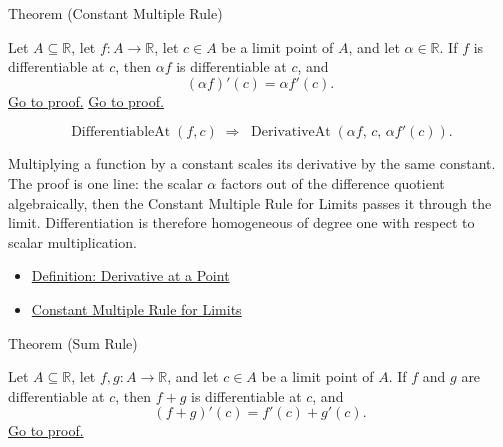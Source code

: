 
\begin{theorembox}{Theorem (Constant Multiple Rule)}
\begin{theorem}
\label{thm:constant-multiple-rule}
Let $A \subseteq \mathbb{R}$, let $f : A \to \mathbb{R}$, let $c \in A$ be a limit point of $A$, and let $\alpha \in \mathbb{R}$. If $f$ is differentiable at $c$, then $\alpha f$ is differentiable at $c$, and
\[
(\alpha f)'(c) = \alpha f'(c).
\]
\hyperref[prf:constant-multiple]{Go to proof.}
\hyperref[prf:constant-multiple-rule]{Go to proof.}
\end{theorem}
\end{theorembox}

\begin{remark*}
\[
\operatorname{DifferentiableAt}(f,c) \;\Rightarrow\;
\operatorname{DerivativeAt}(\alpha f,\,c,\,\alpha f'(c)).
\]
\end{remark*}

\begin{remark*}[Interpretation]
Multiplying a function by a constant scales its derivative by the same constant. The proof is one line: the scalar $\alpha$ factors out of the difference quotient algebraically, then the Constant Multiple Rule for Limits passes it through the limit. Differentiation is therefore homogeneous of degree one with respect to scalar multiplication.
\end{remark*}

\begin{dependencies}
\begin{itemize}
  \item \hyperref[def:derivative-at-a-point]{Definition: Derivative at a Point}
  \item \hyperref[thm:limit-scalar-multiple]{Constant Multiple Rule for Limits}
\end{itemize}
\end{dependencies}


\begin{theorembox}{Theorem (Sum Rule)}
\begin{theorem}
\label{thm:sum-rule}
Let $A \subseteq \mathbb{R}$, let $f, g : A \to \mathbb{R}$, and let $c \in A$ be a limit point of $A$. If $f$ and $g$ are differentiable at $c$, then $f + g$ is differentiable at $c$, and
\[
(f+g)'(c) = f'(c) + g'(c).
\]
\hyperref[prf:sum-rule]{Go to proof.}
\end{theorem}
\end{theorembox}

